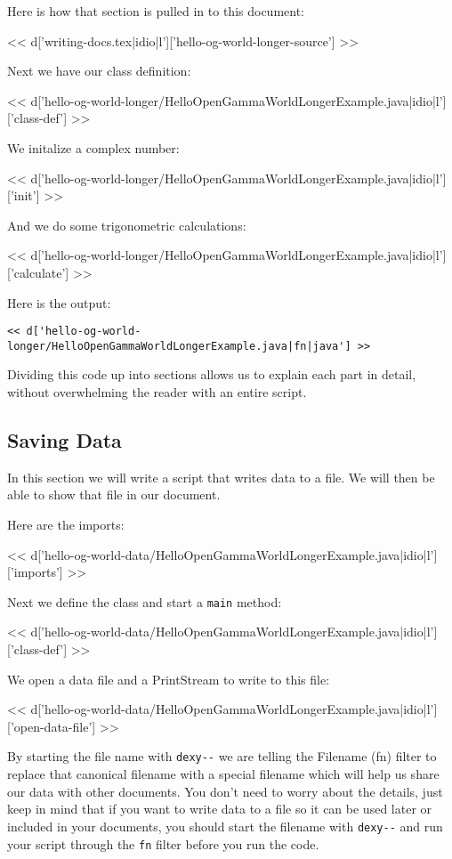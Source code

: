 Here is how that section is pulled in to this document:

<< d['writing-docs.tex|idio|l']['hello-og-world-longer-source'] >>

Next we have our class definition:

<< d['hello-og-world-longer/HelloOpenGammaWorldLongerExample.java|idio|l']['class-def'] >>

We initalize a complex number:

<< d['hello-og-world-longer/HelloOpenGammaWorldLongerExample.java|idio|l']['init'] >>

And we do some trigonometric calculations:

<< d['hello-og-world-longer/HelloOpenGammaWorldLongerExample.java|idio|l']['calculate'] >>

Here is the output:

\begin{Verbatim}
<< d['hello-og-world-longer/HelloOpenGammaWorldLongerExample.java|fn|java'] >>
\end{Verbatim}

Dividing this code up into sections allows us to explain each part in detail,
without overwhelming the reader with an entire script.

\subsection{Saving Data}

In this section we will write a script that writes data to a file. We will then
be able to show that file in our document.

Here are the imports:

<< d['hello-og-world-data/HelloOpenGammaWorldLongerExample.java|idio|l']['imports'] >>

Next we define the class and start a \verb|main| method:

<< d['hello-og-world-data/HelloOpenGammaWorldLongerExample.java|idio|l']['class-def'] >>

We open a data file and a PrintStream to write to this file:

<< d['hello-og-world-data/HelloOpenGammaWorldLongerExample.java|idio|l']['open-data-file'] >>

By starting the file name with \verb|dexy--| we are telling the Filename (fn)
filter to replace that canonical filename with a special filename which will
help us share our data with other documents. You don't need to worry about the
details, just keep in mind that if you want to write data to a file so it can
be used later or included in your documents, you should start the filename with
\verb|dexy--| and run your script through the \verb|fn| filter before you run
the code.

